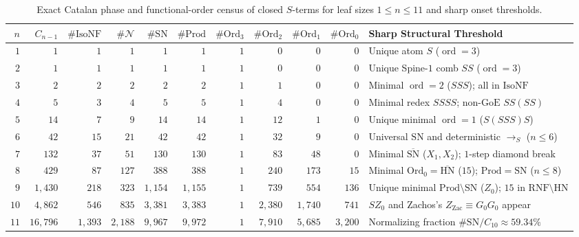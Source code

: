 \documentclass[11pt,reqno]{amsart}
\numberwithin{equation}{section}
\theoremstyle{plain}
\theoremstyle{definition}
\theoremstyle{remark}
\DeclareMathOperator{\ord}{ord}
\newcommand{\RNF}{\mathrm{RNF}}
\newcommand{\SN}{\mathrm{SN}}
\newcommand{\HN}{\mathrm{HN}}
\newcommand{\Prod}{\mathrm{Prod}}
\newcommand{\redS}{\to_S}
\begin{document}
\begin{table}[htbp]
\centering
\caption{Exact Catalan phase and functional-order census of closed $S$-terms for leaf sizes $1 \le n \le 11$ and sharp onset thresholds.}
\label{tab:catalan-census}
\footnotesize
\setlength{\tabcolsep}{3.6pt}
\begin{tabular}{@{}rrrrrrrrrrl@{}}
\toprule
$n$ & $C_{n-1}$ & $\#\mathrm{IsoNF}$ & $\#\mathcal{N}$ & $\#\SN$ & $\#\Prod$ & $\#\mathrm{Ord}_3$ & $\#\mathrm{Ord}_2$ & $\#\mathrm{Ord}_1$ & $\#\mathrm{Ord}_0$ & Sharp Structural Threshold \\
\midrule
$1$ & $1$ & $1$ & $1$ & $1$ & $1$ & $1$ & $0$ & $0$ & $0$ & Unique atom $S$ ($\ord = 3$) \\
$2$ & $1$ & $1$ & $1$ & $1$ & $1$ & $1$ & $0$ & $0$ & $0$ & Unique Spine-$1$ comb $S S$ ($\ord = 3$) \\
$3$ & $2$ & $2$ & $2$ & $2$ & $2$ & $1$ & $1$ & $0$ & $0$ & Minimal $\ord = 2$ ($S S S$); all in $\mathrm{IsoNF}$ \\
$4$ & $5$ & $3$ & $4$ & $5$ & $5$ & $1$ & $4$ & $0$ & $0$ & Minimal redex $S S S S$; non-$\mathrm{GoE}$ $S S(S S)$ \\
$5$ & $14$ & $7$ & $9$ & $14$ & $14$ & $1$ & $12$ & $1$ & $0$ & Unique minimal $\ord = 1$ ($S(S S S)S$) \\
$6$ & $42$ & $15$ & $21$ & $42$ & $42$ & $1$ & $32$ & $9$ & $0$ & Universal $\SN$ and deterministic $\redS$ ($n \le 6$) \\
$7$ & $132$ & $37$ & $51$ & $130$ & $130$ & $1$ & $83$ & $48$ & $0$ & Minimal $\overline{\SN}$ ($X_1, X_2$); $1$-step diamond break \\
$8$ & $429$ & $87$ & $127$ & $388$ & $388$ & $1$ & $240$ & $173$ & $15$ & Minimal $\mathrm{Ord}_0 = \overline{\HN}$ ($15$); $\Prod = \SN$ ($n \le 8$) \\
$9$ & $1{,}430$ & $218$ & $323$ & $1{,}154$ & $1{,}155$ & $1$ & $739$ & $554$ & $136$ & Unique minimal $\Prod \setminus \SN$ ($Z_0$); $15$ in $\RNF\setminus\HN$ \\
$10$ & $4{,}862$ & $546$ & $835$ & $3{,}381$ & $3{,}383$ & $1$ & $2{,}380$ & $1{,}740$ & $741$ & $S Z_0$ and Zachos's $Z_{\mathrm{Zac}} \equiv G_0 G_0$ appear \\
$11$ & $16{,}796$ & $1{,}393$ & $2{,}188$ & $9{,}967$ & $9{,}972$ & $1$ & $7{,}910$ & $5{,}685$ & $3{,}200$ & Normalizing fraction $\#\SN / C_{10} \approx 59.34\%$ \\
\bottomrule
\end{tabular}
\end{table}
\end{document}

